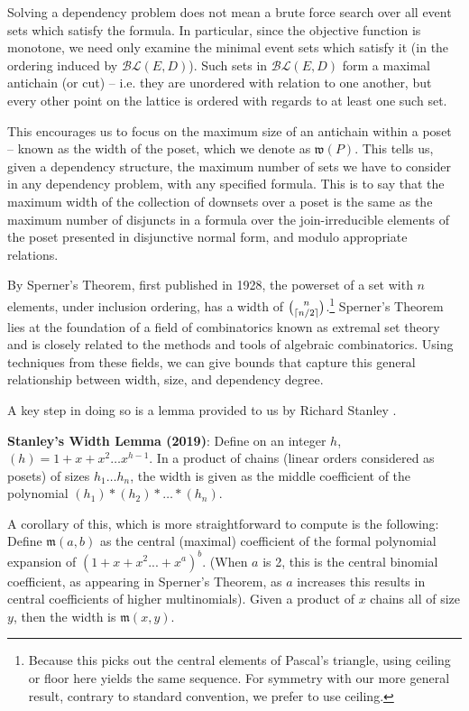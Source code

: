 \documentclass[a4paper,USenglish,cleveref, autoref, thm-restate,authorcolumns]{lipics-v2019}
\newcommand{\BLc}{\mathcal{BL}}
\newcommand{\Mf}{\mathfrak{m}}
\newcommand{\Wf}{\mathfrak{w}}
\DeclarePairedDelimiter\ceil{\lceil}{\rceil}
\begin{document}
Solving a dependency problem does not mean a brute force search over all event sets which satisfy the formula. In particular, since the objective function is monotone, we need only examine the minimal event sets which satisfy it (in the ordering induced by \(\BLc(E,D)\)). Such sets in \(\BLc(E,D)\) form a maximal  antichain (or cut) -- i.e. they are unordered with relation to one another, but every other point on the lattice is ordered with regards to at least one such set.

This encourages us to focus on the maximum size of an antichain within a poset -- known as the width of the poset, which we denote as \(\Wf(P)\). This tells us, given a dependency structure, the maximum number of sets we have to consider in any dependency problem, with any specified formula. This is to say that the maximum width of the collection of downsets over a poset is the same as the maximum number of disjuncts in a formula over the join-irreducible elements of the poset presented in disjunctive normal form, and modulo appropriate relations.  

By Sperner's Theorem, first published in 1928, the powerset of a set with \(n\) elements, under inclusion ordering, has a width of \(\binom{n}{\ceil{n/2}}\).\footnote{Because this picks out the central elements of Pascal's triangle, using ceiling or floor here yields the same sequence. For symmetry with our more general result, contrary to standard convention, we prefer to use ceiling.}  Sperner's Theorem lies at the foundation of a field of combinatorics known as extremal set theory and is closely related to the methods and tools of algebraic combinatorics. Using techniques from these fields, we can give bounds that capture this general relationship between width, size, and dependency degree.

A key step in doing so is a lemma provided to us by Richard Stanley \cite{343183}.

\begin{lemma}
\textbf{Stanley's Width Lemma (2019)}: Define on an integer \(h\), \((h) = 1 + x + x^2 \ldots x^{h-1}\). In a product of chains (linear orders considered as posets) of sizes \(h_1 \ldots h_n\), the width is given as the middle coefficient of the polynomial \((h_1) * (h_2) * \ldots * (h_n)\).
\end{lemma}

A corollary of this, which is more straightforward to compute is the following:  Define \(\Mf(a,b)\) as the central (maximal) coefficient of the formal polynomial expansion of \((1 + x + x^2 ... + x^a)^b\). (When \(a\) is 2, this is the central binomial coefficient, as appearing in Sperner's Theorem, as \(a\) increases this results in central coefficients of higher multinomials). Given a product of \(x\) chains all of size \(y\), then the width is \(\Mf(x,y)\).
\end{document}
